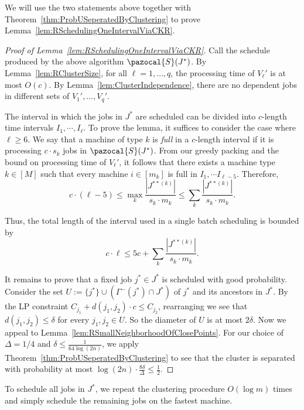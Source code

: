   
  We will use the two statements above together with Theorem~\ref{thm:ProbUSeperatedByClustering} to prove Lemma~\ref{lem:RSchedulingOneIntervalViaCKR}.
  
  \begin{proof}[Proof of Lemma~\ref{lem:RSchedulingOneIntervalViaCKR}]
  
    Call the schedule produced by the above algorithm $\pazocal{S}(J^*)$.
    By Lemma~\ref{lem:RClusterSize}, for all $\ell=1,\ldots,q$, the processing time of $V_{\ell}' $ is at most $O(c)$.
    By Lemma~\ref{lem:ClusterIndependence}, there are no dependent
    jobs in different sets of $V_1',\ldots,V_q'$. 
  
    
    The interval in which the jobs in $J^*$ are scheduled can be divided into $c$-length time intervals $I_1,\cdots,I_{\ell}$. 
    To prove the lemma, it suffices to consider the case where $\ell \ge 6$.
    We say that a machine of type $k$ is \emph{full} in a $c$-length interval if it is processing $c \cdot s_k$ jobs in $\pazocal{S}(J^*)$.
    From our greedy packing and the bound on processing time of $V_{\ell}'$, it follows that there exists a machine type $k \in [M]$ such that every machine $i \in [m_k]$ is full in $I_1, \cdots I_{\ell-5}$.
    Therefore, 
    \[c\cdot(\ell -5) \le \max_{k}\frac{|J^{**(k)}|}{s_k \cdot m_k} \le\sum_{k}\frac{|J^{**(k)}|}{s_k \cdot m_k}.
    \]
    
    Thus, the total length of the interval used in a single batch scheduling is bounded by
    \[ c\cdot \ell \le 5c+ \sum_{k}\frac{|J^{**(k)}|}{s_k \cdot m_k}.
    \]
  
  
  It remains to prove that a fixed job $j^* \in J^*$ is scheduled with good probability.
  Consider the set $U := \{ j^* \} \cup (\Gamma^-(j^*) \cap J^*)$ of $j^*$ and its ancestors in $J^*$.
  By the LP constraint $C_{j_1} + d(j_1,j_2) \cdot c \leq C_{j_2}$, rearranging we see that $d(j_1,j_2)  \leq \delta$ for every $j_1, j_2 \in U$.   
  So the diameter of $U$ is at most $2\delta$.
  Now we appeal to Lemma~\ref{lem:RSmallNeighborhoodOfClosePoints}.
  For our choice of $\Delta = 1/4$ and $\delta \leq \frac{1}{64 \log(2n) }$,
  we apply Theorem~\ref{thm:ProbUSeperatedByClustering} to see that
  the cluster is separated with probability at most 
   $\log(2n) \cdot  \frac{8 \delta}{\Delta} \leq \frac{1}{2}$.
  \end{proof}
  
  To schedule all jobs in $J^*$, we repeat the clustering procedure $O(\log m)$ times and simply schedule the remaining jobs on the fastest machine. 
  
